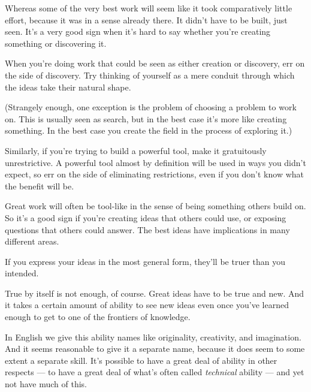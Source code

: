 Whereas some of the very best work
                  will seem like it took comparatively little effort, because it
                  was in a sense already there. It didn't have to be built, just
                  seen. It's a very good sign when it's hard to say whether
                  you're creating something or discovering it.

When
                  you're doing work that could be seen as either creation or
                  discovery, err on the side of discovery. Try thinking of
                  yourself as a mere conduit through which the ideas take their
                  natural shape.

(Strangely enough, one exception is
                  the problem of choosing a problem to work on. This is usually
                  seen as search, but in the best case it's more like creating
                  something. In the best case you create the field in the
                  process of exploring it.)

Similarly, if you're
                  trying to build a powerful tool, make it gratuitously
                  unrestrictive. A powerful tool almost by definition will be
                  used in ways you didn't expect, so err on the side of
                  eliminating restrictions, even if you don't know what the
                  benefit will be.

Great work will often be tool-like
                  in the sense of being something others build on. So it's a
                  good sign if you're creating ideas that others could use, or
                  exposing questions that others could answer. The best ideas
                  have implications in many different areas.

If you
                  express your ideas in the most general form, they'll be truer
                  than you intended.






                  True by itself is not enough, of course. Great ideas have to
                  be true and new. And it takes a certain amount of ability to
                  see new ideas even once you've learned enough to get to one of
                  the frontiers of knowledge.

In English we give this
                  ability names like originality, creativity, and imagination.
                  And it seems reasonable to give it a separate name, because it
                  does seem to some extent a separate skill. It's possible to
                  have a great deal of ability in other respects --- to have
                  a great deal of what's often called \emph{technical} ability
                  --- and yet not have much of this.

